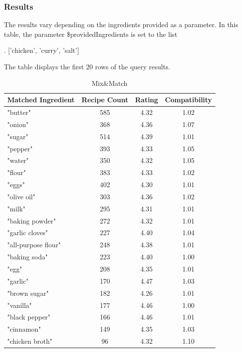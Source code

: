 \begin{enumerate}
    \subsubsection{Results}
The results vary depending on the ingredients provided as a parameter. In this table, the parameter \$providedIngredients is set to the list 
\begin{CypherQuery}
.
['chicken', 'curry', 'salt']
\end{CypherQuery}
The table displays the first 20 rows of the query results.
 \begin{table}[h!]
\centering
\begin{tabular}{lccc}
\hline
\textbf{Matched Ingredient} & \textbf{Recipe Count} & \textbf{Rating} & \textbf{Compatibility} \\
\hline
"butter"                    & 585 & 4.32 & 1.02 \\
"onion"                     & 368 & 4.36 & 1.07 \\
"sugar"                     & 514 & 4.39 & 1.01 \\
"pepper"                    & 393 & 4.33 & 1.05 \\
"water"                     & 350 & 4.32 & 1.05 \\
"flour"                     & 383 & 4.33 & 1.02 \\
"eggs"                      & 402 & 4.30 & 1.01 \\
"olive oil"                 & 303 & 4.36 & 1.02 \\
"milk"                      & 295 & 4.31 & 1.01 \\
"baking powder"             & 272 & 4.32 & 1.01 \\
"garlic cloves"             & 227 & 4.40 & 1.04 \\
"all-purpose flour"         & 248 & 4.38 & 1.01 \\
"baking soda"               & 223 & 4.40 & 1.00 \\
"egg"                       & 208 & 4.35 & 1.01 \\
"garlic"                    & 170 & 4.47 & 1.03 \\
"brown sugar"               & 182 & 4.26 & 1.01 \\
"vanilla"                   & 177 & 4.46 & 1.00 \\
"black pepper"             & 166 & 4.46 & 1.01 \\
"cinnamon"              & 149 & 4.35 & 1.03 \\
"chicken broth"             & 96  & 4.32 & 1.10 \\
\hline
\end{tabular}
\caption{Mix\&Match}
\end{table}

\end{enumerate}
